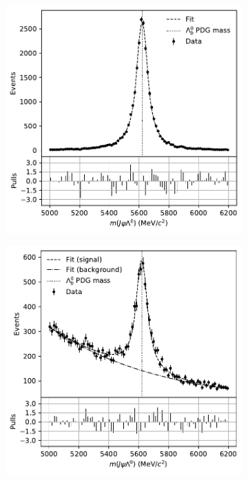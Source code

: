 \begin{figure}[t]
	\centering
	\begin{subfigure}{.45\textwidth}
		\includegraphics[width=\textwidth]{graphics/04-event_selection/MC_lambdab_hard_fit.pdf}
		\caption{}
	\end{subfigure}
	\begin{subfigure}{.45\textwidth}
		\includegraphics[width=\textwidth]{graphics/04-event_selection/data_lambdab_hard_fit.pdf}

\end{subfigure}
\end{figure}
